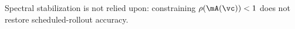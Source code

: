 Spectral stabilization is not relied upon: constraining $\rho(\mA(\vc))<1$ does not restore scheduled-rollout accuracy.

